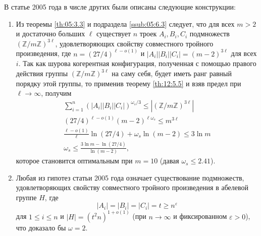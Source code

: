 В статье 2005 года в числе других были описаны следующие конструкции:
\begin{enumerate}
     \item Из теоремы \ref{th:05:3.3} и подраздела \ref{ssub:05:6.3} следует, что для всех $m > 2$ и достаточно больших $\ell$ существует $n$ троек $A_i,B_i,C_i$ подмножеств $(\mathbb{Z}/ m \mathbb{Z})^{3 \ell}$, удовлетворяющих свойству совместного тройного произведения, где $n = (27/4)^{\ell - o(1)}$ и $|A_i||B_i||C_i| = (m-2)^{3 \ell}$ для всех $i$. Так как шурова когерентная конфигурация, полученная с помощью правого действия группы $(\mathbb{Z}/ m \mathbb{Z})^{3 \ell}$ на саму себя, будет иметь ранг равный порядку этой группы, то применив теорему \ref{th:12:5.5} и взяв предел при $\ell \to \infty$, получим
     \begin{gather*}
     	\sum_{i=1}^n \left( |A_i||B_i||C_i| \right)^{\omega_s/3} \leq |(\mathbb{Z}/ m \mathbb{Z})^{3 \ell}|\\
     	(27/4)^{\ell - o(1)} (m-2)^{\ell \omega_s} \leq m^{3 \ell}\\
     	\frac{\ell - o(1)}{\ell} \ln(27/4) + \omega_s \ln(m-2) \leq 3 \ln m\\
     	\omega_s \leq \frac{3 \ln m - \ln(27/4)}{\ln(m-2)},
     \end{gather*}
     которое становится оптимальным при $m = 10$ (давая $\omega_s \leq 2.41$).
     \item \label{it:2:gas} Любая из гипотез статьи 2005 года означает существование подмножеств, удовлетворяющих свойству совместного тройного произведения в абелевой группе $H$, где
     \[
     	|A_i| = |B_i| = |C_i| = t \geq n^\varepsilon
     \]
     для $1 \leq i \leq n$ и $|H| = (t^2 n)^{1 + o(1)}$ (при $n \to \infty$ и фиксированном $\varepsilon > 0$), что доказало бы $\omega = 2$. 
\end{enumerate}

